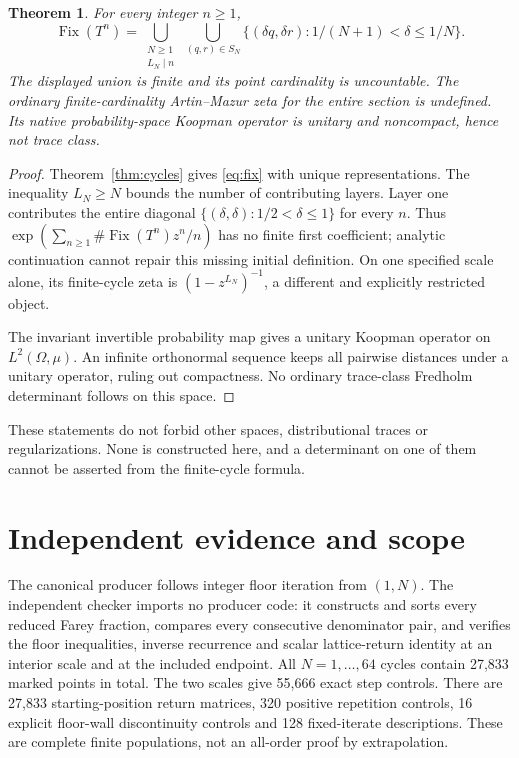 \documentclass[10pt]{article}
\newcommand{\Fix}{\operatorname{Fix}}
\newtheorem{theorem}{Theorem}
\begin{document}
\begin{theorem}\label{thm:stop}
For every integer $n\geq1$,
\begin{equation}\label{eq:fix}
\Fix(T^n)=
\bigcup_{\substack{N\geq1\\L_N\mid n}}
\ \bigcup_{(q,r)\in S_N}
\{(\delta q,\delta r):1/(N+1)<\delta\leq1/N\}.
\end{equation}
The displayed union is finite and its point cardinality is uncountable.
The ordinary finite-cardinality Artin--Mazur zeta for the entire section
is undefined. Its native probability-space Koopman operator is unitary
and noncompact, hence not trace class.
\end{theorem}
\begin{proof}
Theorem~\ref{thm:cycles} gives \eqref{eq:fix} with unique representations.
The inequality $L_N\geq N$ bounds the number of contributing layers.
Layer one contributes the entire diagonal
$\{(\delta,\delta):1/2<\delta\leq1\}$ for every $n$.
Thus $\exp(\sum_{n\geq1}\#\Fix(T^n)z^n/n)$ has no finite first coefficient;
analytic continuation cannot repair this missing initial definition.
On one specified scale alone, its finite-cycle zeta is
$(1-z^{L_N})^{-1}$, a different and explicitly restricted object.

The invariant invertible probability map gives a unitary Koopman operator
on $L^2(\Omega,\mu)$. An infinite orthonormal sequence keeps all pairwise
distances under a unitary operator, ruling out compactness.
No ordinary trace-class Fredholm determinant follows on this space.
\end{proof}
These statements do not forbid other spaces, distributional traces or
regularizations. None is constructed here, and a determinant on one of
them cannot be asserted from the finite-cycle formula.
\fi

\section{Independent evidence and scope}
The canonical producer follows integer floor iteration from $(1,N)$.
The independent checker imports no producer code: it constructs and sorts
every reduced Farey fraction, compares every consecutive denominator
pair, and verifies the floor inequalities, inverse recurrence and scalar
lattice-return identity at an interior scale and at the included endpoint.
All $N=1,\ldots,64$ cycles contain 27,833 marked points in total.
The two scales give 55,666 exact step controls. There are 27,833
starting-position return matrices, 320 positive repetition controls,
16 explicit floor-wall discontinuity controls and 128 fixed-iterate
descriptions. These are complete finite populations, not an all-order
proof by extrapolation.
\end{document}
